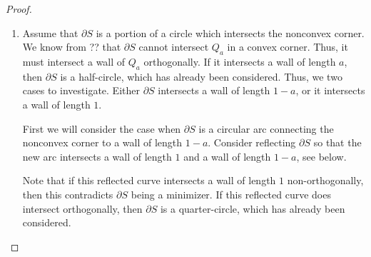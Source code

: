 \documentclass[leqno]{article}
\numberwithin{equation}{section}
\theoremstyle{definition}
\theoremstyle{remark}
\theoremstyle{plain}
\begin{document}
{\begin{proof}
\begin{enumerate}
        If $S$ is the region on the outside of the quarter-circle, then the area $t$ can be fit inside of the quarter-circle with a perimeter smaller than $|\partial S|$. This contradicts $\partial S$ being a minimizer.
        
        \item Assume that $\partial S$ is a portion of a circle which intersects the nonconvex corner. We know from ?? that $\partial S$ cannot intersect $Q_a$ in a convex corner. Thus, it must intersect a wall of $Q_a$ orthogonally. If it intersects a wall of length $a$, then $\partial S$ is a half-circle, which has already been considered. Thus, we two cases to investigate. Either $\partial S$ intersects a wall of length $1-a$, or it intersects a wall of length $1$.

        First we will consider the case when $\partial S$ is a circular arc connecting the nonconvex corner to a wall of length $1-a$. Consider reflecting $\partial S$ so that the new arc intersects a wall of length $1$ and a wall of length $1-a$, see below.

        \begin{center}
            \hspace{5em}
        \end{center}
        Note that if this reflected curve intersects a wall of length $1$ non-orthogonally, then this contradicts $\partial S$ being a minimizer. If this reflected curve does intersect orthogonally, then $\partial S$ is a quarter-circle, which has already been considered.


\end{enumerate}
\end{proof}}
\end{document}
